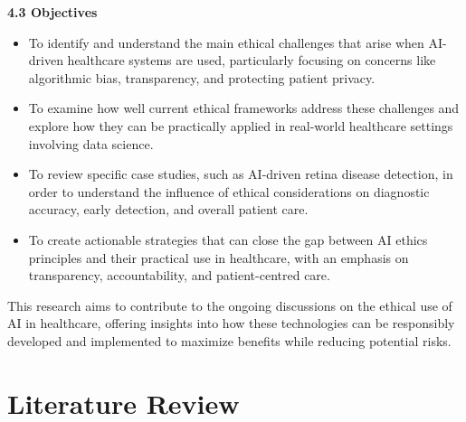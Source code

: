 \documentclass[a4paper, 12pt]{article}
\begin{document}
\textbf{\large 4.3 \hspace{5mm} Objectives}
\begin{itemize}
\item To identify and understand the main ethical challenges that arise when AI-driven healthcare systems are used, particularly focusing on concerns like algorithmic bias, transparency, and protecting patient privacy. 

\item To examine how well current ethical frameworks address these challenges and explore how they can be practically applied in real-world healthcare settings involving data science.

\item To review specific case studies, such as AI-driven retina disease detection, in order to understand the influence of ethical considerations on diagnostic accuracy, early detection, and overall patient care.

\item To create actionable strategies that can close the gap between AI ethics principles and their practical use in healthcare, with an emphasis on transparency, accountability, and patient-centred care.
\end{itemize}

This research aims to contribute to the ongoing discussions on the ethical use of AI in healthcare, offering insights into how these technologies can be responsibly developed and implemented to maximize benefits while reducing potential risks.
\pagebreak

\section{Literature Review}
\end{document}
